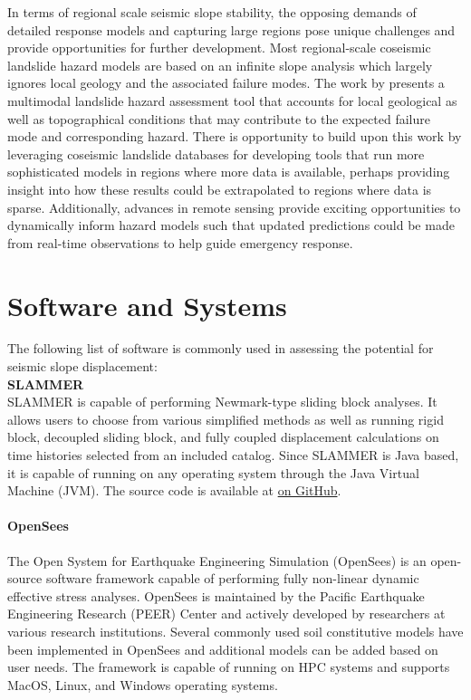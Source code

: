 In terms of regional scale seismic slope stability, the opposing demands of detailed response models and capturing large regions pose unique challenges and provide opportunities for further development. Most regional-scale coseismic landslide hazard models are based on an infinite slope analysis which largely ignores local geology and the associated failure modes. The work by \cite{grant2016multimodal} presents a multimodal landslide hazard assessment tool that accounts for local geological as well as topographical conditions that may contribute to the expected failure mode and corresponding hazard. There is opportunity to build upon this work by leveraging coseismic landslide databases for developing tools that run more sophisticated models in regions where more data is available, perhaps providing insight into how these results could be extrapolated to regions where data is sparse. Additionally, advances in remote sensing provide exciting opportunities to dynamically inform hazard models such that updated predictions could be made from real-time observations to help guide emergency response.


\section{Software and Systems}
\label{sec:eq_landslide_tools}

The following list of software is commonly used in assessing the potential for seismic slope displacement:\\

\noindent\textbf{SLAMMER}\\
SLAMMER \citep{jibson2013slammer} is capable of performing Newmark-type sliding block analyses. It allows users to choose from various simplified methods as well as running rigid block, decoupled sliding block, and fully coupled displacement calculations on time histories selected from an included catalog. Since SLAMMER is Java based, it is capable of running on any operating system through the Java Virtual Machine (JVM). The source code is available at \href{https://github.com/mjibson/slammer}{on GitHub}.

\paragraph{OpenSees}
The Open System for Earthquake Engineering Simulation (OpenSees) is an open-source software framework capable of performing fully non-linear dynamic effective stress analyses. OpenSees is maintained by the Pacific Earthquake Engineering Research (PEER) Center and actively developed by researchers at various research institutions. Several commonly used soil constitutive models have been implemented in OpenSees and additional models can be added based on user needs. The framework is capable of running on HPC systems and supports MacOS, Linux, and Windows operating systems.

